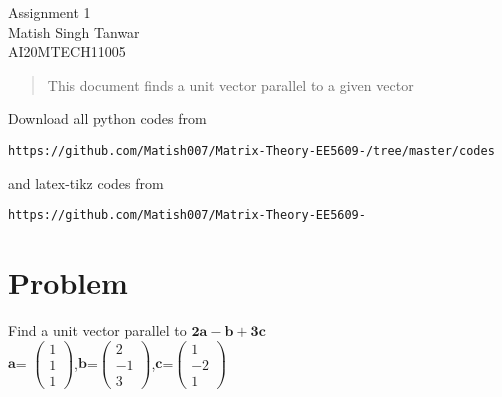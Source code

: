\documentclass[journal,12pt,twocolumn]{IEEEtran}
\begin{document}
\begin{center}
\huge Assignment 1\\

\large Matish Singh Tanwar\\
\large AI20MTECH11005\\
\end{center}
\vspace{1.0cm}
\begin{abstract}
This document finds a unit vector parallel to a given vector
\end{abstract}
\vspace{0.5cm}
Download all python codes from 
\begin{lstlisting}
https://github.com/Matish007/Matrix-Theory-EE5609-/tree/master/codes
\end{lstlisting}
%
and latex-tikz codes from 
\begin{lstlisting}
https://github.com/Matish007/Matrix-Theory-EE5609-
\end{lstlisting}
%
\vspace{0.5mm}
\section{Problem}
Find a unit vector parallel to $\bm{2a}-\bm{b}+\bm{3c}$\\
$\bm{a}$= $\begin{pmatrix}1 \\1 \\1\end{pmatrix}$,$\bm{b}$=$\begin{pmatrix}2 \\-1 \\3\end{pmatrix}$,$\bm{c}$=$\begin{pmatrix}1 \\-2 \\1\end{pmatrix}$\\
\end{document}
